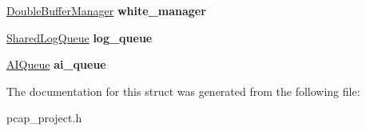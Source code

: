 \begin{DoxyCompactItemize}
\item 
\mbox{\label{structEngineContext_af566033b93923005121c3f3c46ccace1}} 
\mbox{\hyperlink{structDoubleBufferManager}{Double\+Buffer\+Manager}} {\bfseries white\+\_\+manager}
\item 
\mbox{\label{structEngineContext_ab76bbeeffec34ddd57d3941e421d70bc}} 
\mbox{\hyperlink{structSharedLogQueue}{Shared\+Log\+Queue}} {\bfseries log\+\_\+queue}
\item 
\mbox{\label{structEngineContext_a1933b322bb9eb062d39d018857e9f8cf}} 
\mbox{\hyperlink{structAIQueue}{A\+I\+Queue}} {\bfseries ai\+\_\+queue}
\end{DoxyCompactItemize}


The documentation for this struct was generated from the following file\+:\begin{DoxyCompactItemize}
\item 
pcap\+\_\+project.\+h\end{DoxyCompactItemize}
